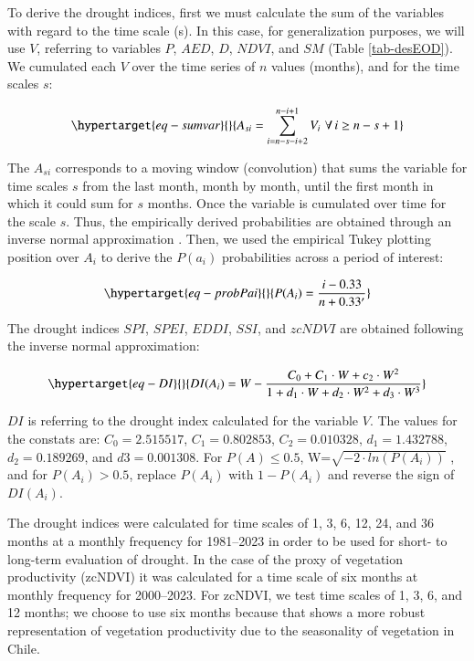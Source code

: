 \documentclass[
  authoryear,
  preprint,
  3p,
  onecolumn]{elsarticle}
\begin{document}
To derive the drought indices, first we must calculate the sum of the
variables with regard to the time scale (s). In this case, for
generalization purposes, we will use \(V\), referring to variables
\(P\), \(AED\), \(D\), \(NDVI\), and \(SM\) (Table \ref{tab-desEOD}). We
cumulated each \(V\) over the time series of \(n\) values (months), and
for the time scales \(s\):

\begin{equation}\protect\hypertarget{eq-sumvar}{}{A_{si} = \sum_{i=n-s-i+2}^{n-i+1} V_i\,\, \forall\, i\geq n-s+1  }\label{eq-sumvar}\end{equation}

The \(A_{si}\) corresponds to a moving window (convolution) that sums
the variable for time scales \(s\) from the last month, month by month,
until the first month in which it could sum for \(s\) months. Once the
variable is cumulated over time for the scale \(s\). Thus, the
empirically derived probabilities are obtained through an inverse normal
approximation \citep{Abramowitz1968}. Then, we used the empirical Tukey
plotting position \citep{Wilks2011} over \(A_i\) to derive the
\(P(a_i)\) probabilities across a period of interest:

\begin{equation}\protect\hypertarget{eq-probPai}{}{P(A_i) = \frac{i-0.33}{n+0.33'}}\label{eq-probPai}\end{equation}

The drought indices \(SPI\), \(SPEI\), \(EDDI\), \(SSI\), and \(zcNDVI\)
are obtained following the inverse normal approximation:

\begin{equation}\protect\hypertarget{eq-DI}{}{DI(A_i) = W - \frac{C_0+C_1\cdot W + c_2 \cdot W^2}{1+d_1\cdot W +d_2\cdot W^2 +d_3\cdot W^3}}\label{eq-DI}\end{equation}

\(DI\) is referring to the drought index calculated for the variable
\(V\). The values for the constats are: \(C_0 = 2.515517\),
\(C_1 = 0.802853\), \(C_2 = 0.010328\), \(d_1 = 1.432788\),
\(d_2 = 0.189269\), and \(d3 = 0.001308\). For \(P(A) \leq 0.5\),
W=\(\sqrt{-2\cdot ln(P(A_i))}\) , and for \(P(A_i) > 0.5\), replace
\(P(A_i)\) with \(1-P(A_i)\) and reverse the sign of \(DI(A_i)\).

The drought indices were calculated for time scales of 1, 3, 6, 12, 24,
and 36 months at a monthly frequency for 1981--2023 in order to be used
for short- to long-term evaluation of drought. In the case of the proxy
of vegetation productivity (zcNDVI) it was calculated for a time scale
of six months at monthly frequency for 2000--2023. For zcNDVI, we test
time scales of 1, 3, 6, and 12 months; we choose to use six months
because that shows a more robust representation of vegetation
productivity due to the seasonality of vegetation in Chile.
\end{document}
